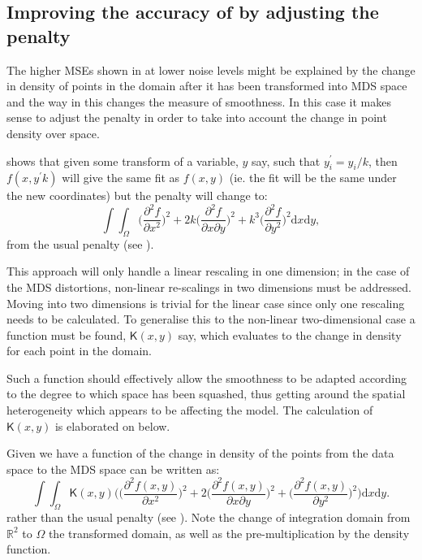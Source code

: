 \subsection{Improving the accuracy of \mdsap by adjusting the penalty}

The higher MSEs shown in  at lower noise levels might be explained by the change in density of points in the domain after it has been transformed into MDS space and the way in this changes the measure of smoothness. In this case it makes sense to adjust the penalty in order to take into account the change in point density over space.

\cite{wood2000} shows that given some transform of a variable, $y$ say, such that $y_i^\prime=y_i/k$, then $f(x,y^\prime k)$ will give the same fit as $f(x,y)$ (ie. the fit will be the same under the new coordinates) but the penalty will change to:
\begin{equation}
\int\int_\Omega \Big( \frac{\partial^2 f}{\partial x^2} \Big)^2 + 2k\Big( \frac{\partial^2 f}{\partial x \partial y} \Big)^2 + k^3\Big( \frac{\partial^2 f}{\partial y^2} \Big)^2 \text{d}x \text{d}y,
\label{adjustedintegral}
\end{equation}
from the usual \tprs penalty (see ).

This approach will only handle a linear rescaling in one dimension; in the case of the MDS distortions, non-linear re-scalings in two dimensions must be addressed. Moving into two dimensions is trivial for the linear case since only one rescaling needs to be calculated. To generalise this to the non-linear two-dimensional case a function must be found, $\mathsf{K}(x,y)$ say, which evaluates to the change in density for each point in the domain. 

Such a function should effectively allow the smoothness to be adapted according to the degree to which space has been squashed, thus getting around the spatial heterogeneity which appears to be affecting the model. The calculation of $\mathsf{K}(x,y)$ is elaborated on below.

Given we have a function of the change in density of the points from the data space to the MDS space  can be written as:
\begin{equation}
\int\int_\Omega \mathsf{K}(x,y) \Big( \Big(\frac{\partial^2 f(x,y)}{\partial x^2}\Big)^2 + 2\Big(\frac{\partial^2 f(x,y)}{\partial x \partial y}\Big)^2 + \Big(\frac{\partial^2 f(x,y)}{\partial y^2}\Big)^2\Big) \text{d}x\text{d}y.
\label{kdeadjust}
\end{equation}
rather than the usual \tprs penalty (see ). Note the change of integration domain from $\mathbb{R}^2$ to $\Omega$ the transformed domain, as well as the pre-multiplication by the density function.

